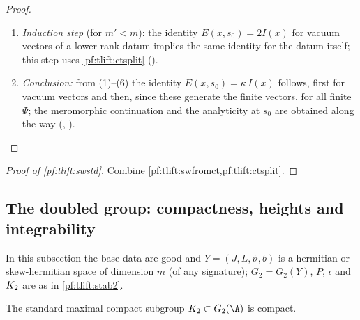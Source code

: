 \begin{proof}
\begin{enumerate}[label=(\arabic*),nosep]
  $c=0$ (for vacuum vectors) if $m'<m$ (,
  ,
  ); and $\mathrm{orb}_T(\omega_2(x)\Phi)$ is the $T$-th Fourier
  coefficient of the theta integral ().
\item \emph{Induction step} (for $m'<m$): the identity $E(x,s_0)=2I(x)$ for vacuum vectors of a lower-rank datum
  implies the same identity for the datum itself; this step uses \cref{pf:tlift:ctsplit}
  ().
\item \emph{Conclusion:} from (1)--(6) the identity $E(x,s_0)=\kappa\,I(x)$ follows, first for vacuum vectors and then,
  since these generate the finite vectors, for all finite $\Psi$; the meromorphic continuation and the analyticity at
  $s_0$ are obtained along the way (,
  ).
\end{enumerate}
\end{proof}

\begin{proof}[Proof of \cref{pf:tlift:swstd}]
Combine \cref{pf:tlift:swfromct,pf:tlift:ctsplit}.
\end{proof}

\subsection{The doubled group: compactness, heights and integrability}\label{pf:tlift:dblgrp}

In this subsection the base data are good and $Y=(J,L,\vartheta,b)$ is a hermitian or skew-hermitian space of
dimension $m$ (of any signature); $G_2=G_2(Y)$, $P$, $\iota$ and $K_2$ are as in
\cref{pf:tlift:stab2}.

\begin{lemma}\label{pf:tlift:stab2cpt}
The standard maximal compact subgroup $\tliftK\subset G_2(\A)$ is compact.
\end{lemma}

